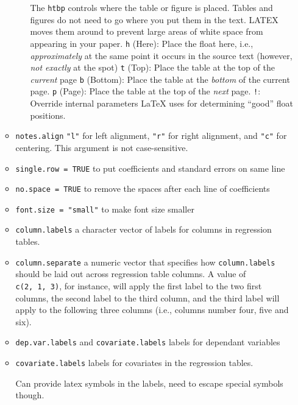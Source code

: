\documentclass[
  a4paper,
  twoside,
  openright]{book}
\theoremstyle{definition}
\theoremstyle{definition}
\theoremstyle{definition}
\theoremstyle{definition}
\theoremstyle{remark}
\begin{document}
\begin{itemize}
\begin{itemize}
\begin{itemize}
      The \texttt{htbp} controls where the table or figure is placed. Tables and figures do not need to go where you put them in the text. LATEX moves them around to prevent large areas of white space from appearing in your paper.
      \texttt{h} (Here): Place the float here, i.e., \emph{approximately} at the same point it occurs in the source text (however, \emph{not exactly} at the spot)
      \texttt{t} (Top): Place the table at the top of the \emph{current} page
      \texttt{b} (Bottom): Place the table at the \emph{bottom} of the current page.
      \texttt{p} (Page): Place the table at the top of the \emph{next} page.
      \texttt{!}: Override internal parameters LaTeX uses for determining ``good'' float positions.
    \end{itemize}
  \item
    \texttt{notes.align} \texttt{"l"} for left alignment, \texttt{"r"} for right alignment, and \texttt{"c"} for centering. This argument is not case-sensitive.
  \item
    \texttt{single.row\ =\ TRUE} to put coefficients and standard errors on same line
  \item
    {\texttt{no.space\ =\ TRUE}} to remove the spaces after each line of coefficients
  \item
    \texttt{font.size\ =\ "small"} to make font size smaller
  \item
    \texttt{column.labels} a character vector of labels for columns in regression tables.
  \item
    \texttt{column.separate} a numeric vector that specifies how \texttt{column.labels} should be laid out across regression table columns. A value of \texttt{c(2,\ 1,\ 3)}, for instance, will apply the first label to the two first columns, the second label to the third column, and the third label will apply to the following three columns (i.e., columns number four, five and six).
  \item
    \texttt{dep.var.labels} and \texttt{covariate.labels} labels for dependant variables
  \item
    {\texttt{covariate.labels}} labels for covariates in the regression tables.

    Can provide latex symbols in the labels, need to escape special symbols though.


\end{itemize}
\end{itemize}
\end{document}
